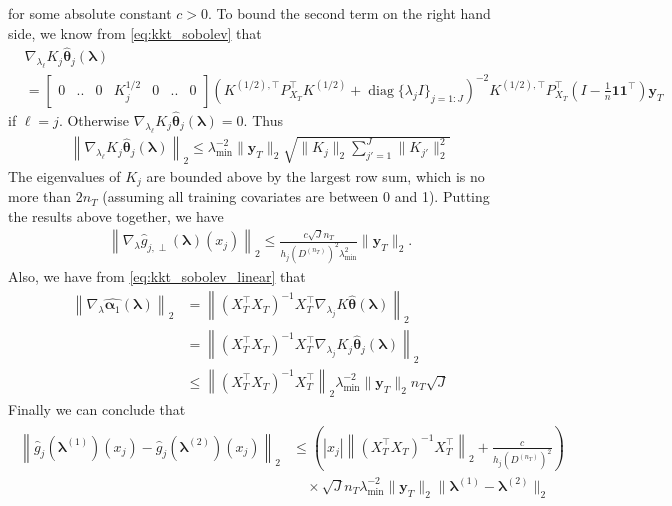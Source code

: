 \documentclass[10pt]{book}
\theoremstyle{definition}
\DeclareMathOperator{\diag}{diag}
\begin{document}
	for some absolute constant $c > 0$.
	To bound the second term on the right hand side, we know from \eqref{eq:kkt_sobolev} that
	\begin{align}
	& \nabla_{\lambda_\ell} K_j \hat{\boldsymbol{\theta}}_j(\boldsymbol{\lambda})\\
	& = 
	\left[
	\begin{matrix}
	0 & .. & 0 & K_j^{1/2} & 0 & .. & 0
	\end{matrix}
	\right]
	\left(
	K^{(1/2), \top} P_{X_T}^\top K^{(1/2)} + \diag\{\lambda_j I\}_{j=1:J}
	\right)^{-2}
	K^{(1/2), \top}
	P_{X_T}^\top (I - \frac{1}{n} \boldsymbol{1} \boldsymbol{1}^\top) \boldsymbol{y}_T
	\end{align}
	if $\ell = j$.
	Otherwise $\nabla_{\lambda_\ell} K_j \hat{\boldsymbol{\theta}}_j(\boldsymbol{\lambda}) = 0$.
	Thus
	\begin{align}
	\left\|
	\nabla_{\lambda_\ell} K_j \hat{\boldsymbol{\theta}}_j(\boldsymbol{\lambda})
	\right \|_2
	\le
	\lambda_{\min}^{-2} \|\boldsymbol{y}_T\|_2 \sqrt{\|K_j\|_2 \sum_{{j'}=1}^J \|K_{j'}\|_2^2}
	\end{align}
	The eigenvalues of $K_j$ are bounded above by the largest row sum, which is no more than $2 n_T$ (assuming all training covariates are between 0 and 1).
	Putting the results above together, we have
	\begin{align}
	\left \|
	\nabla_{\lambda} \hat{g}_{j, \perp}(\boldsymbol{\lambda})(x_j)
	\right \|_2
	\le
	\frac{c \sqrt{J} n_T}{h_j(D^{(n_T)})^2 \lambda_{\min}^2}
	\|\boldsymbol{y}_T\|_2.
	\end{align}
	Also, we have from \eqref{eq:kkt_sobolev_linear} that
	\begin{align}
	\left \| \nabla_{\lambda} \hat{\boldsymbol{\alpha}_1}(\boldsymbol{\lambda}) \right \|_2
	& =
	\left \|
	\left(
	X_T^\top X_T
	\right)^{-1}
	X_T^\top
	\nabla_{\lambda_j} K \hat{\boldsymbol{\theta}}(\boldsymbol{\lambda})
	\right \|_2 \\
	& =
	\left \|
	\left(
	X_T^\top X_T
	\right)^{-1}
	X_T^\top
	\nabla_{\lambda_j} K_j \hat{\boldsymbol{\theta}}_j(\boldsymbol{\lambda})
	\right \|_2 \\
	& \le
	\left \|
	\left(
	X_T^\top X_T
	\right)^{-1}
	X_T^\top
	\right \|_2
	\lambda_{\min}^{-2} \|\boldsymbol{y}_T\|_2 n_T \sqrt{J}
	\end{align}
	Finally we can conclude that
	\begin{align}
	\begin{split}
	\left \|
	\hat{g}_j(\boldsymbol{\lambda}^{(1)})(x_j)
	- \hat{g}_j(\boldsymbol{\lambda}^{(2)})(x_j)
	\right \|_2
	& \le
	\left(
	|x_j|
	\left \|
	\left(
	X_T^\top X_T
	\right)^{-1}
	X_T^\top
	\right \|_2
	+
	\frac{c }{h_j(D^{(n_T)})^2}
	\right)\\
	& \quad \times
	\sqrt{J}
	n_T
	\lambda_{\min}^{-2}
	\|\boldsymbol{y}_T\|_2
	\| \boldsymbol{\lambda}^{(1)} - \boldsymbol{\lambda}^{(2)}\|_2
	\end{split}
	\label{eq:sob_add_comp}
	\end{align}
\end{document}
